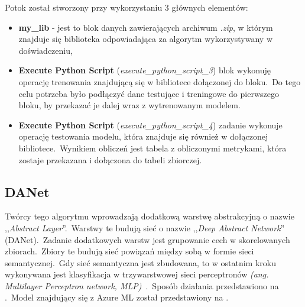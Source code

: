 Potok został stworzony przy wykorzystaniu 3 głównych elementów:
\begin{itemize}
    \item \textbf{my\_lib} - jest to blok danych zawierających archiwum \textit{.zip}, w którym znajduje się biblioteka odpowiadająca za algorytm wykorzystywany w doświadczeniu,
    \item \textbf{Execute Python Script} (\textit{execute\_python\_script\_3}) blok wykonuję operację trenowania znajdującą się w bibliotece dołączonej do bloku.\ Do tego celu potrzeba było podłączyć dane testujące i treningowe do pierwszego bloku, by przekazać je dalej wraz z wytrenowanym modelem.
    \item \textbf{Execute Python Script} (\textit{execute\_python\_script\_4}) zadanie wykonuje operację testowania modelu, która znajduje się również w dołączonej bibliotece.\ Wynikiem obliczeń jest tabela z obliczonymi metrykami, która zostaje przekazana i dołączona do tabeli zbiorczej.
\end{itemize}

\subsection{DANet}
Twórcy tego algorytmu wprowadzają dodatkową warstwę abstrakcyjną o nazwie ,,\textit{Abstract Layer}''.\ Warstwy te budują sieć o nazwie ,,\textit{Deep Abstract Network}'' (DANet).\ Zadanie dodatkowych warstw jest grupowanie cech w skorelowanych zbiorach.\ Zbiory te budują sieć powiązań między sobą w formie sieci semantycznej.\ Gdy sieć semantyczna jest zbudowana, to w ostatnim kroku wykonywana jest klasyfikacja w trzywarstwowej sieci perceptronów \textit{(ang. Multilayer Perceptron network, MLP)}~\cite{Chen2022, Danet}.\ Sposób działania przedstawiono na .\ Model znajdujący się z Azure ML został przedstawiony na .

